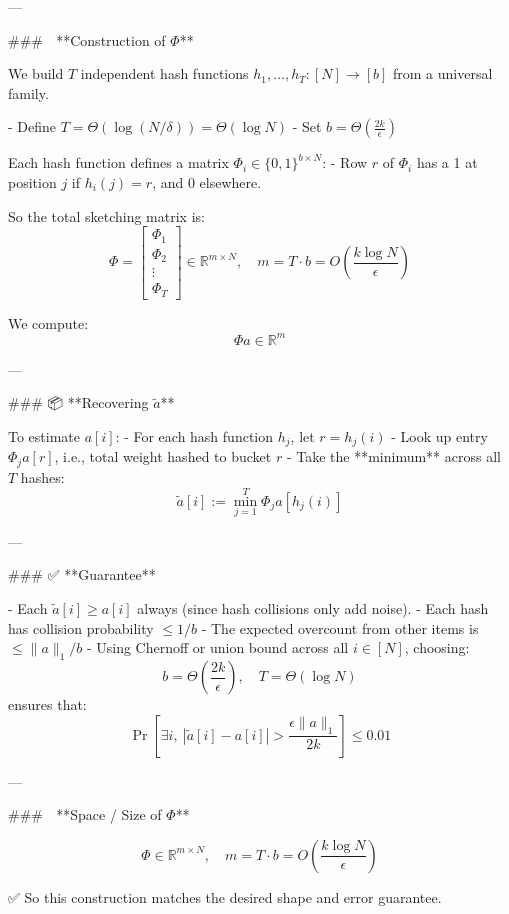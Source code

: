 \begin{enumerate}
\begin{shaded}
  ---
  
  ### 🔨 **Construction of \(\Phi\)**
  
  We build \(T\) independent hash functions \(h_1, \dots, h_T : [N] \to [b]\) from a universal family.
  
  - Define \(T = \Theta(\log(N/\delta)) = \Theta(\log N)\)
  - Set \(b = \Theta\left( \frac{2k}{\epsilon} \right)\)
  
  Each hash function defines a matrix \( \Phi_i \in \{0,1\}^{b \times N} \):
  - Row \(r\) of \(\Phi_i\) has a 1 at position \(j\) if \(h_i(j) = r\), and 0 elsewhere.
  
  So the total sketching matrix is:
  \[
  \Phi = 
  \begin{bmatrix}
  \Phi_1 \\
  \Phi_2 \\
  \vdots \\
  \Phi_T
  \end{bmatrix}
  \in \mathbb{R}^{m \times N}, \quad m = T \cdot b = O\left( \frac{k \log N}{\epsilon} \right)
  \]
  
  We compute:
  \[
  \Phi a \in \mathbb{R}^m
  \]
  
  ---
  
  ### 📦 **Recovering \(\tilde{a}\)**
  
  To estimate \(a[i]\):
  - For each hash function \(h_j\), let \(r = h_j(i)\)
  - Look up entry \(\Phi_j a[r]\), i.e., total weight hashed to bucket \(r\)
  - Take the **minimum** across all \(T\) hashes:
  \[
  \tilde{a}[i] := \min_{j=1}^T \Phi_j a[h_j(i)]
  \]
  
  ---
  
  ### ✅ **Guarantee**
  
  - Each \(\tilde{a}[i] \geq a[i]\) always (since hash collisions only add noise).
  - Each hash has collision probability \(\le 1/b\)
  - The expected overcount from other items is \(\le \|a\|_1 / b\)
  - Using Chernoff or union bound across all \(i \in [N]\), choosing:
  \[
  b = \Theta\left( \frac{2k}{\epsilon} \right),\quad T = \Theta(\log N)
  \]
  ensures that:
  \[
  \Pr\left[ \exists i,\ |\tilde{a}[i] - a[i]| > \frac{\epsilon \|a\|_1}{2k} \right] \le 0.01
  \]
  
  ---
  
  ### 🧮 **Space / Size of \(\Phi\)**
  
  \[
  \Phi \in \mathbb{R}^{m \times N}, \quad m = T \cdot b = O\left( \frac{k \log N}{\epsilon} \right)
  \]
  
  ✅ So this construction matches the desired shape and error guarantee.
  

\end{shaded}
\end{enumerate}

